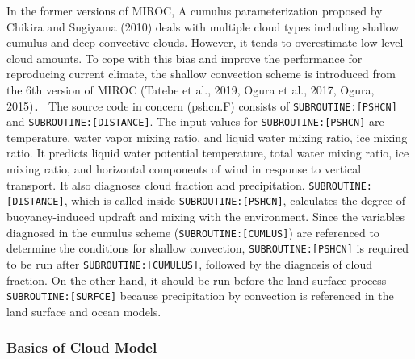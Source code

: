 In the former versions of MIROC, A cumulus parameterization proposed by Chikira and Sugiyama (2010) deals with multiple cloud types including shallow cumulus and deep convective clouds. However, it
tends to overestimate low-level cloud amounts. To cope with this bias and improve the performance for reproducing current climate, the shallow convection scheme is introduced from the 6th version of
MIROC (Tatebe et al., 2019, Ogura et al., 2017, Ogura, 2015)． The source code in concern (pshcn.F) consists of \texttt{SUBROUTINE:{[}PSHCN{]}} and \texttt{SUBROUTINE:{[}DISTANCE{]}}. The input values
for \texttt{SUBROUTINE:{[}PSHCN{]}} are temperature, water vapor mixing ratio, and liquid water mixing ratio, ice mixing ratio. It predicts liquid water potential temperature, total water mixing
ratio, ice mixing ratio, and horizontal components of wind in response to vertical transport. It also diagnoses cloud fraction and precipitation. \texttt{SUBROUTINE:{[}DISTANCE{]}}, which is called
inside \texttt{SUBROUTINE:{[}PSHCN{]}}, calculates the degree of buoyancy-induced updraft and mixing with the environment. Since the variables diagnosed in the cumulus scheme
(\texttt{SUBROUTINE:{[}CUMLUS{]}}) are referenced to determine the conditions for shallow convection, \texttt{SUBROUTINE:{[}PSHCN{]}} is required to be run after \texttt{SUBROUTINE:{[}CUMULUS{]}},
followed by the diagnosis of cloud fraction. On the other hand, it should be run before the land surface process \texttt{SUBROUTINE:{[}SURFCE{]}} because precipitation by convection is referenced in
the land surface and ocean models.

\hypertarget{basics-of-cloud-model}{%
\subsubsection{Basics of Cloud Model}\label{basics-of-cloud-model}}

